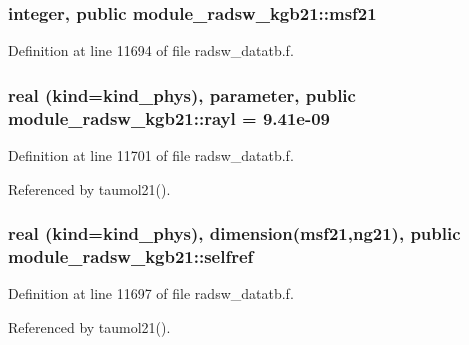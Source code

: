 \subsubsection[{\texorpdfstring{msf21}{msf21}}]{\setlength{\rightskip}{0pt plus 5cm}integer, public module\+\_\+radsw\+\_\+kgb21\+::msf21}\hypertarget{namespacemodule__radsw__kgb21_ae70b5abfa847419cbf189d2502c34ddd}{}\label{namespacemodule__radsw__kgb21_ae70b5abfa847419cbf189d2502c34ddd}


Definition at line 11694 of file radsw\+\_\+datatb.\+f.

\subsubsection[{\texorpdfstring{rayl}{rayl}}]{\setlength{\rightskip}{0pt plus 5cm}real (kind=kind\+\_\+phys), parameter, public module\+\_\+radsw\+\_\+kgb21\+::rayl = 9.\+41e-\/09}\hypertarget{namespacemodule__radsw__kgb21_a8df418599fb8aef5fc8f2935a913b361}{}\label{namespacemodule__radsw__kgb21_a8df418599fb8aef5fc8f2935a913b361}


Definition at line 11701 of file radsw\+\_\+datatb.\+f.



Referenced by taumol21().

\subsubsection[{\texorpdfstring{selfref}{selfref}}]{\setlength{\rightskip}{0pt plus 5cm}real (kind=kind\+\_\+phys), dimension({\bf msf21},ng21), public module\+\_\+radsw\+\_\+kgb21\+::selfref}\hypertarget{namespacemodule__radsw__kgb21_a76fc3e4566fcee982b99b10ea562ba93}{}\label{namespacemodule__radsw__kgb21_a76fc3e4566fcee982b99b10ea562ba93}


Definition at line 11697 of file radsw\+\_\+datatb.\+f.



Referenced by taumol21().

